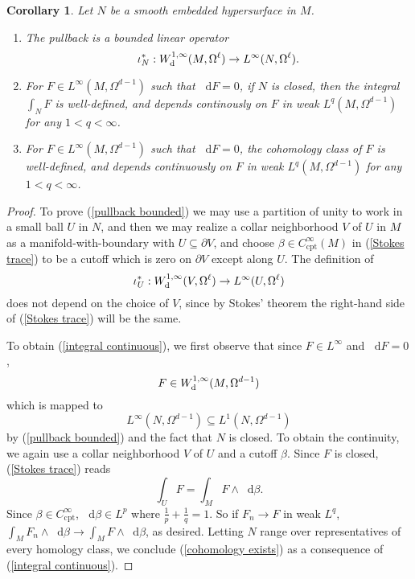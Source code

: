 \documentclass[reqno,11pt]{amsart}
\newcommand*\dif{\mathop{}\!\mathrm{d}}
\newcommand{\cpt}{\mathrm{cpt}}
\newtheorem{corollary}[theorem]{Corollary}
\theoremstyle{definition}
\numberwithin{equation}{section}
\begin{document}
\begin{corollary}\label{trace on cycles}
Let $N$ be a smooth embedded hypersurface in $M$.
\begin{enumerate}
\item \label{pullback bounded} The pullback is a bounded linear operator
$$\iota^*_N: W^{1, \infty}_{\rm d}(M, \Omega^\ell) \to L^\infty(N, \Omega^\ell).$$
\item \label{integral continuous} For $F \in L^\infty(M, \Omega^{d - 1})$ such that $\dif F = 0$, if $N$ is closed, then the integral $\int_N F$ is well-defined, and depends continously on $F$ in weak $L^q(M, \Omega^{d - 1})$ for any $1 < q < \infty$.
\item \label{cohomology exists} For $F \in L^\infty(M, \Omega^{d - 1})$ such that $\dif F = 0$, the cohomology class of $F$ is well-defined, and depends continuously on $F$ in weak $L^q(M, \Omega^{d - 1})$ for any $1 < q < \infty$.
\end{enumerate}
\end{corollary}
\begin{proof}
To prove (\ref{pullback bounded}) we may use a partition of unity to work in a small ball $U$ in $N$, and then we may realize a collar neighborhood $V$ of $U$ in $M$ as a manifold-with-boundary with $U \subseteq \partial V$, and choose $\beta \in C^\infty_\cpt(M)$ in (\ref{Stokes trace}) to be a cutoff which is zero on $\partial V$ except along $U$.
The definition of
$$\iota^*_U: W^{1, \infty}_{\rm d}(V, \Omega^\ell) \to L^\infty(U, \Omega^\ell)$$
does not depend on the choice of $V$, since by Stokes' theorem the right-hand side of (\ref{Stokes trace}) will be the same.

To obtain (\ref{integral continuous}), we first observe that since $F \in L^\infty$ and $\dif F = 0$,
$$F \in W^{1, \infty}_{\rm d}(M, \Omega^{d - 1})$$
which is mapped to
$$L^\infty(N, \Omega^{d - 1}) \subseteq L^1(N, \Omega^{d - 1})$$
by (\ref{pullback bounded}) and the fact that $N$ is closed.
To obtain the continuity, we again use a collar neighborhood $V$ of $U$ and a cutoff $\beta$.
Since $F$ is closed, (\ref{Stokes trace}) reads 
$$\int_U F = \int_M F \wedge \dif \beta.$$
Since $\beta \in C^\infty_\cpt$, $\dif \beta \in L^p$ where $\frac{1}{p} + \frac{1}{q} = 1$.
So if $F_n \to F$ in weak $L^q$, $\int_M F_n \wedge \dif \beta \to \int_M F \wedge \dif \beta$, as desired.
Letting $N$ range over representatives of every homology class, we conclude (\ref{cohomology exists}) as a consequence of (\ref{integral continuous}).
\end{proof}
\end{document}
